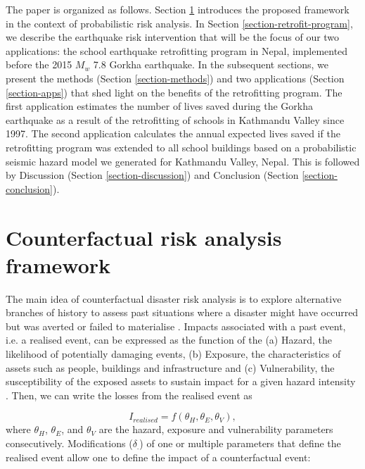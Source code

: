 The paper is organized as follows. Section \ref{section-counter} introduces the proposed framework in the context of probabilistic risk analysis. In Section \ref{section-retrofit-program}, we describe the earthquake risk intervention that will be the focus of our two applications: the school earthquake retrofitting program in Nepal, implemented before the 2015 $M_{w}$ 7.8 Gorkha earthquake. In the subsequent sections, we present the methods (Section \ref{section-methods}) and two applications (Section \ref{section-apps}) that shed light on the benefits of the retrofitting program. The first application estimates the number of lives saved during the Gorkha earthquake as a result of the retrofitting of schools in Kathmandu Valley since 1997. The second application calculates the annual expected lives saved if the retrofitting program was extended to all school buildings based on a probabilistic seismic hazard model we generated for Kathmandu Valley, Nepal. This is followed by Discussion (Section \ref{section-discussion}) and Conclusion (Section \ref{section-conclusion}).


\section{Counterfactual risk analysis framework}
\label{section-counter}

The main idea of counterfactual disaster risk analysis is to explore alternative branches of history to assess past situations where a disaster might have occurred but was averted or failed to materialise \citep{woo2018counterfactualvar}. Impacts associated with a past event, i.e. a realised event, can be expressed as the function of the (a) Hazard, the likelihood of potentially damaging events, (b) Exposure, the characteristics of assets such as people, buildings and infrastructure and (c) Vulnerability, the susceptibility of the exposed assets to sustain impact for a given hazard intensity \citep{UNISDRterms2009}. Then, we can write the losses from the realised event as 

\begin{equation}\label{eq:realised}
        I_{realised} = f \left( \theta_H, \theta_E, \theta_V \right),
    \end{equation}
where $\theta_H$, $\theta_E$, and $\theta_V$ are the hazard, exposure and vulnerability parameters consecutively. Modifications ($\delta_.$) of one or multiple parameters that define the realised event allow one to define the impact of a counterfactual event:

